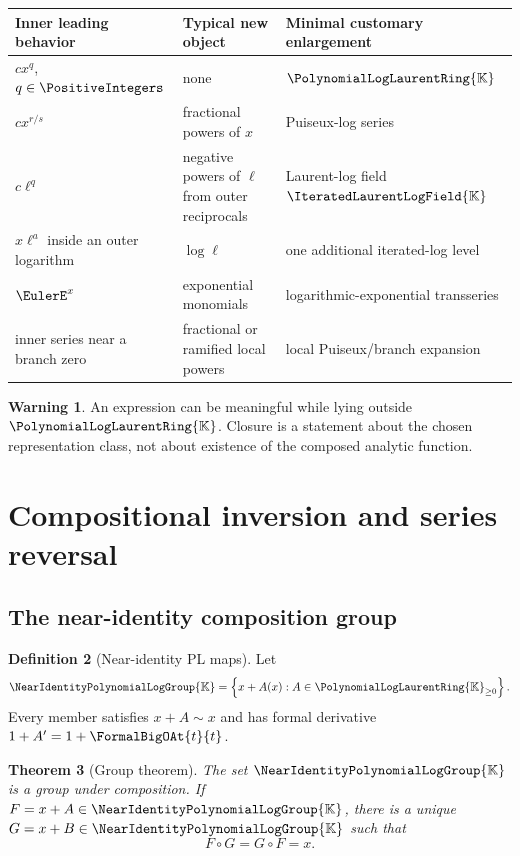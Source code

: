 \documentclass[11pt,oneside]{article}
\numberwithin{equation}{section}
\newtheorem{theorem}{Theorem}[section]
\theoremstyle{definition}
\newtheorem{definition}[theorem]{Definition}
\newtheorem{warning}[theorem]{Warning}
\newcommand{\K}{\mathbb{K}}
\newcommand{\PL}{\PolynomialLogLaurentRing{\K}}
\newcommand{\HL}{\IteratedLaurentLogField{\K}}
\newcommand{\Gnear}{\NearIdentityPolynomialLogGroup{\K}}
\newcommand{\as}{\sim}
\begin{document}
\begin{center}
\begin{tabularx}{0.95\textwidth}{@{}>{\raggedright\arraybackslash}p{}
>{\raggedright\arraybackslash}p{}X@{}}
\toprule
Inner leading behavior & Typical new object & Minimal customary enlargement\\
\midrule
\(cx^q\), \(q\in\PositiveIntegers\) & none & \(\PL\)\\
\(cx^{r/s}\) & fractional powers of \(x\) & Puiseux-log series\\
\(c\ell^q\) & negative powers of \(\ell\) from outer reciprocals & Laurent-log field \(\HL\)\\
\(x\ell^a\) inside an outer logarithm & \(\log\ell\) & one additional iterated-log level\\
\(\EulerE^x\) & exponential monomials & logarithmic-exponential transseries\\
inner series near a branch zero & fractional or ramified local powers & local Puiseux/branch expansion\\
\bottomrule
\end{tabularx}
\end{center}

\begin{warning}
An expression can be meaningful while lying outside \(\PL\).  Closure is a
statement about the chosen representation class, not about existence of the
composed analytic function.
\end{warning}

\section{Compositional inversion and series reversal}\label{sec:reversion}

\subsection{The near-identity composition group}

\begin{definition}[Near-identity PL maps]
Let
\begin{equation}\label{eq:near-group}
  \Gnear=\left\{x+A(x):A\in{\PL}_{\ge0}\right\}.
\end{equation}
Every member satisfies \(x+A\as x\) and has formal derivative
\(1+A'=1+\FormalBigOAt{t}{t}\).
\end{definition}

\begin{theorem}[Group theorem]\label{thm:near-group}
The set \(\Gnear\) is a group under composition.  If
\(F=x+A\in\Gnear\), there is a unique
\(G=x+B\in\Gnear\) such that
\begin{equation}\label{eq:two-sided-inverse}
  F\circ G=G\circ F=x.
\end{equation}
\end{theorem}
\end{document}
